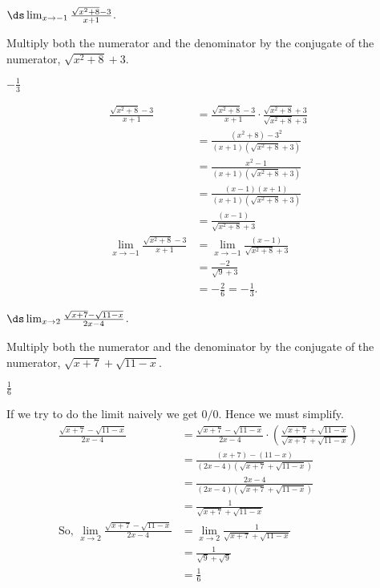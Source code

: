 \begin{Mquestion}[2015Q]
    $\ds \lim_{x\to -1} \frac{\sqrt{x^2+8}-3}{x+1}$.
\end{Mquestion}
\begin{hint}
Multiply both the numerator and the denominator by the
        conjugate of the numerator,  $\sqrt{x^2+8}+3$.
\end{hint}
\begin{answer}
$-\frac{1}{3}$
\end{answer}
\begin{solution}
 \begin{align*}
  \frac{\sqrt{x^2+8}-3}{x+1}
  &= \frac{\sqrt{x^2+8}-3}{x+1}
  \cdot \frac{\sqrt{x^2+8}+3}{\sqrt{x^2+8}+3}\\
  &= \frac{(x^2+8)-3^2}{(x+1)(\sqrt{x^2+8}+3)} \\
  &= \frac{x^2-1}{(x+1)(\sqrt{x^2+8}+3)} \\
  &= \frac{(x-1)(x+1)}{(x+1)(\sqrt{x^2+8}+3)} \\
  &= \frac{(x-1)}{\sqrt{x^2+8}+3} \\
  \lim_{x\to -1} \frac{\sqrt{x^2+8}-3}{x+1}
  &=\lim_{x\to-1} \frac{(x-1)}{\sqrt{x^2+8}+3} \\
  &= \frac{-2}{\sqrt{9}+3 }\\
  &= -\frac{2}{6} = -\frac{1}{3}.
\end{align*}
\end{solution}




\begin{question}[2015Q]
 $\ds \lim_{x\to 2} \frac{\sqrt{x+7}-\sqrt{11-x}}{2x-4}$.
\end{question}
\begin{hint}
Multiply both the numerator and the denominator by the
        conjugate of the numerator, $\sqrt{x+7}+\sqrt{11-x}$.
        \end{hint}
\begin{answer}
$\frac{1}{6} $
\end{answer}
\begin{solution}
If we try to do the limit naively we get $0/0$. Hence we must simplify.
 \begin{align*}
\frac{\sqrt{x+7}-\sqrt{11-x}}{2x-4}
  &= \frac{\sqrt{x+7}-\sqrt{11-x}}{2x-4}
  \cdot \left(\frac{\sqrt{x+7}+\sqrt{11-x}}{\sqrt{x+7}+\sqrt{11-x}}\right)\\
  &= \frac{(x+7)-(11-x)}{(2x-4)(\sqrt{x+7}+\sqrt{11-x})} \\
  &= \frac{2x-4}{(2x-4)(\sqrt{x+7}+\sqrt{11-x})} \\
  &= \frac{1}{\sqrt{x+7}+\sqrt{11-x}}\\
\mbox{So, }\lim_{x\to2} \frac{\sqrt{x+7}-\sqrt{11-x}}{2x-4}
  &=\lim_{x\to2} \frac{1}{\sqrt{x+7}+\sqrt{11-x}} \\
  &= \frac{1}{\sqrt{9}+\sqrt{9} }\\
  &= \frac{1}{6}
\end{align*}
\end{solution}



